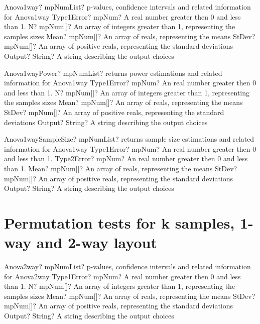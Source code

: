\documentclass[12pt,a4paper,openany]{book}
\begin{document}
\begin{mpFunctionsExtract}
\mpFunctionFiveNotImplemented
{Anova1way? mpNumList? p-values, confidence intervals and related information for Anova1way}
{Type1Error? mpNum? A real number greater then 0 and less than 1.}
{N? mpNum[]? An array of integers greater than 1, representing the samples sizes}
{Mean? mpNum[]? An array of reals, representing the means}
{StDev? mpNum[]? An array of positive reals, representing the standard deviations}
{Output? String? A string describing the output choices}
\end{mpFunctionsExtract}

\begin{mpFunctionsExtract}
\mpFunctionFiveNotImplemented
{Anova1wayPower? mpNumList? returns power estimations and related information for Anova1way}
{Type1Error? mpNum? An real number greater then 0 and less than 1.}
{N? mpNum[]? An array of integers greater than 1, representing the samples sizes}
{Mean? mpNum[]? An array of reals, representing the means}
{StDev? mpNum[]? An array of positive reals, representing the standard deviations}
{Output? String? A string describing the output choices}
\end{mpFunctionsExtract}

\begin{mpFunctionsExtract}
\mpFunctionFiveNotImplemented
{Anova1waySampleSize? mpNumList? returns sample size estimations and related information for Anova1way}
{Type1Error? mpNum? An real number greater then 0 and less than 1.}
{Type2Error? mpNum? An real number greater then 0 and less than 1.}
{Mean? mpNum[]? An array of reals, representing the means}
{StDev? mpNum[]? An array of positive reals, representing the standard deviations}
{Output? String? A string describing the output choices}
\end{mpFunctionsExtract}

\section{Permutation tests for k samples, 1-way and 2-way layout}

\begin{mpFunctionsExtract}
\mpFunctionFiveNotImplemented
{Anova2way? mpNumList? p-values, confidence intervals and related information for Anova2way}
{Type1Error? mpNum? A real number greater then 0 and less than 1.}
{N? mpNum[]? An array of integers greater than 1, representing the samples sizes}
{Mean? mpNum[]? An array of reals, representing the means}
{StDev? mpNum[]? An array of positive reals, representing the standard deviations}
{Output? String? A string describing the output choices}
\end{mpFunctionsExtract}
\end{document}
